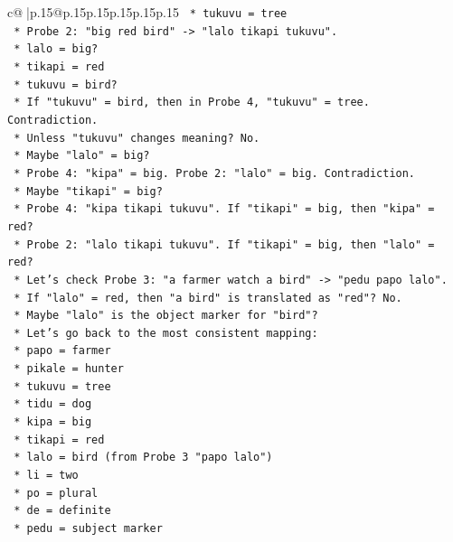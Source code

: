 \documentclass{article}
\begin{document}
{\begin{supertabular}{c@{$\;$}|p{.15\linewidth}@{}p{.15\linewidth}p{.15\linewidth}p{.15\linewidth}p{.15\linewidth}p{.15\linewidth}}
{{{\texttt{            *   tukuvu = tree} \\
\texttt{        *   Probe 2: "big red bird" {-}> "lalo tikapi tukuvu".} \\
\texttt{            *   lalo = big?} \\
\texttt{            *   tikapi = red} \\
\texttt{            *   tukuvu = bird?} \\
\texttt{        *   If "tukuvu" = bird, then in Probe 4, "tukuvu" = tree. Contradiction.} \\
\texttt{        *   Unless "tukuvu" changes meaning? No.} \\
\texttt{        *   Maybe "lalo" = big?} \\
\texttt{        *   Probe 4: "kipa" = big. Probe 2: "lalo" = big. Contradiction.} \\
\texttt{        *   Maybe "tikapi" = big?} \\
\texttt{        *   Probe 4: "kipa tikapi tukuvu". If "tikapi" = big, then "kipa" = red?} \\
\texttt{        *   Probe 2: "lalo tikapi tukuvu". If "tikapi" = big, then "lalo" = red?} \\
\texttt{        *   Let's check Probe 3: "a farmer watch a bird" {-}> "pedu papo lalo".} \\
\texttt{        *   If "lalo" = red, then "a bird" is translated as "red"? No.} \\
\texttt{        *   Maybe "lalo" is the object marker for "bird"?} \\
\texttt{        *   Let's go back to the most consistent mapping:} \\
\texttt{            *   papo = farmer} \\
\texttt{            *   pikale = hunter} \\
\texttt{            *   tukuvu = tree} \\
\texttt{            *   tidu = dog} \\
\texttt{            *   kipa = big} \\
\texttt{            *   tikapi = red} \\
\texttt{            *   lalo = bird (from Probe 3 "papo lalo")} \\
\texttt{            *   li = two} \\
\texttt{            *   po = plural} \\
\texttt{            *   de = definite} \\
\texttt{            *   pedu = subject marker} \\
}}}
\end{supertabular}}
\end{document}
